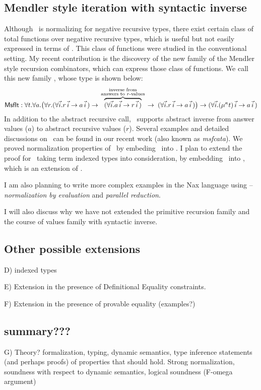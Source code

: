 \subsection{Mendler style iteration with syntactic inverse}
Although \MIt\ is normalizing for negative recursive types, there exist
certain class of total functions over negative recursive types, which is
useful but not easily expressed in terms of \MIt. This class of functions
were studied in the conventional setting. My recent contribution is
the discovery of the new family of the Mendler style recursion combinators,
which can express those class of functions. We call this new family \MsfIt,
whose type is shown below:
\label{sec:mendler:sf}
\[
 \textsf{MsfIt} : \forall t . \forall a .
   \big( \forall r.
            (\forall\vec{i} . r\,\vec{i} -> a\,\vec{i}\,)
   -> \overset{\begin{smallmatrix}
                        \text{inverse from} \\
                        \text{answers to $r$-values} \\
                       \end{smallmatrix}}{\overbrace{
            (\forall\vec{i} . a\,\vec{i} -> r\,\vec{i}\,) }}
   -> \;    (\forall\vec{i} . r\,\vec{i} -> a\,\vec{i}\,)
   \big)
 -> (\forall\vec{i} . (\mu^\kappa t)\,\vec{i} -> a\,\vec{i}\,)
\]
In addition to the abstract recursive call, \MsfIt\ supports abstract
inverse from answer values ($a$) to abstract recursive values ($r$).
Several examples and detailed discussions on \MsfIt\ can be found in
our recent work \cite{AhnShe11} (also known as \textit{msfcata}).
We \cite{AhnShe11} proved normalization properties of \MsfIt\ by
embeding \MsfIt\ into \Fw. I plan to extend the proof for \MsfIt\,
taking term indexed types into consideration, by embedding \MsfIt\
into \Fi, which is an extension of \Fw.

I am also planning to write more complex examples in the Nax language using \MIt
-- \emph{normalization by evaluation} and \emph{parallel reduction}.

I will also discuss why we have not extended the primitive recursion family
and the course of values family with syntactic inverse.

\subsection{Other possible extensions}\label{sec:mendler:etc}
D) indexed types

E) Extension in the presence of Definitional Equality constraints.

F) Extension in the presence of provable equality (examples?)

\subsection{summary???}
G) Theory?
   formalization, typing, dynamic semantics, type inference
   statements (and perhaps proofs) of properties that should hold.
   Strong normalization, soundness with respect to dynamic semantics,
   logical soundness (F-omega argument)


